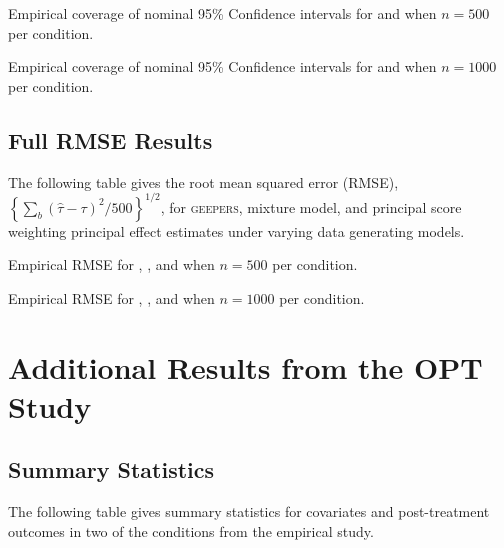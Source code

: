 \documentclass[]{article}
\begin{document}
\begin{table}
  \caption{Empirical coverage of nominal 95\% Confidence intervals for \geepers and \pmm when $n=500$ per condition.}
  
 \end{table}

 \begin{table}
  \caption{Empirical coverage of nominal 95\% Confidence intervals for \geepers and \pmm when $n=1000$ per condition.}
  
 \end{table}


 

\clearpage
\subsection{Full RMSE Results}
The following table gives the root mean squared error (RMSE), $\left\{\sum_b (\hat{\tau}-\tau)^2/500\right\}^{1/2}$, for \textsc{geepers}, mixture model, and principal score weighting principal effect estimates under varying data generating models.\\

\begin{table}
  \caption{Empirical RMSE  for \geepers, \pmm, and \psw when $n=500$ per condition.}
  
 \end{table}


 \begin{table}
  \caption{Empirical RMSE  for \geepers, \pmm, and \psw when $n=1000$ per condition.}
  
 \end{table}

\clearpage


\section{Additional Results from the OPT Study}
\singlespacing
\subsection{Summary Statistics}
The following table gives summary statistics for covariates and post-treatment outcomes in two of the conditions from the empirical study.\\
\end{document}

